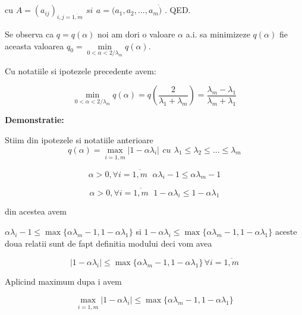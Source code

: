 \documentclass[a4paper,twoside]{book}
\begin{document}
cu $A=(a_{ij})_{i,j=\overline{1,m}}\,\ si\,\ a=(a_{1},a_{2},...,a_{m}\dot{)}$
. QED.

Se observa ca $q=q(\alpha )$ noi am dori o valoare $\alpha $ a.i. sa
minimizeze $q(\alpha )$ fie aceasta valoarea $q_{0}=\underset{0<\alpha
<2/\lambda _{m}}{\min }q(\alpha )$.

Cu notatiile si ipotezele precedente avem:

\begin{equation}
\min_{0<\alpha <2/\lambda _{m}}q(\alpha )=q\left( \frac{2}{\lambda
_{1}+\lambda _{m}}\right) =\frac{\lambda _{m}-\lambda _{1}}{\lambda
_{m}+\lambda _{1}}  \label{R6}
\end{equation}

\textbf{Demonstratie:}

Stiim din ipotezele si notatiile anterioare 
\begin{equation*}
q(\alpha )=\underset{i=\overline{1,m}}{\max }\left\vert 1-\alpha \lambda
_{i}\right\vert \,\ cu\,\ \lambda _{1}\leq \lambda _{2}\leq ...\leq \lambda
_{m}
\end{equation*}

\begin{equation*}
\alpha >0,\forall i=\overline{1,m}\,\ \ \alpha \lambda _{i}-1\leq \alpha
\lambda _{m}-1
\end{equation*}

\begin{equation*}
\alpha >0,\forall i=\overline{1,m}\,\ \ 1-\alpha \lambda _{i}\leq 1-\alpha
\lambda _{1}
\end{equation*}

din acestea avem

$\alpha \lambda _{i}-1\leq \max \{\alpha \lambda _{m}-1,1-\alpha \lambda
_{1}\}$ si $1-\alpha \lambda _{i}\leq \max \{\alpha \lambda _{m}-1,1-\alpha
\lambda _{1}\}$ aceste doua relatii sunt de fapt definitia modului deci vom
avea

\begin{equation*}
\left\vert 1-\alpha \lambda _{i}\right\vert \leq \max \{\alpha \lambda
_{m}-1,1-\alpha \lambda _{1}\}\,\forall i=\overline{1,m}
\end{equation*}

Aplicind maximum dupa i avem

\begin{equation*}
\max_{i=\overline{1,m}}\left\vert 1-\alpha \lambda _{i}\right\vert \leq \max
\{\alpha \lambda _{m}-1,1-\alpha \lambda _{1}\}
\end{equation*}
\end{document}
